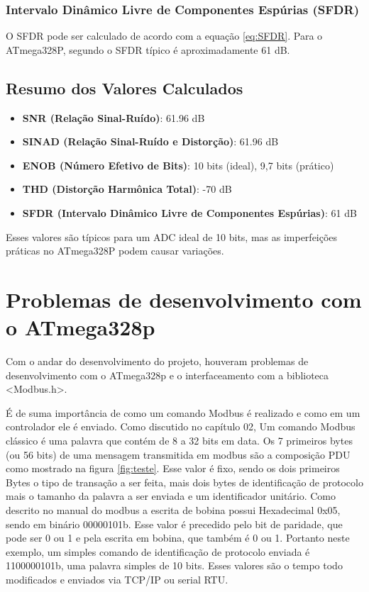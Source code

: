 \subsubsection{Intervalo Dinâmico Livre de Componentes Espúrias (SFDR)}

O SFDR pode ser calculado de acordo com a equação \ref{eq:SFDR}. Para o ATmega328P, segundo \cite{atmega328p_datasheet} o SFDR típico é aproximadamente 61 dB.

\subsection{Resumo dos Valores Calculados}

\begin{itemize}
    \item \textbf{SNR (Relação Sinal-Ruído)}: 61.96 dB
    \item \textbf{SINAD (Relação Sinal-Ruído e Distorção)}: 61.96 dB
    \item \textbf{ENOB (Número Efetivo de Bits)}: 10 bits (ideal), 9,7 bits (prático)
    \item \textbf{THD (Distorção Harmônica Total)}: -70 dB
    \item \textbf{SFDR (Intervalo Dinâmico Livre de Componentes Espúrias)}: 61 dB
\end{itemize}

Esses valores são típicos para um ADC ideal de 10 bits, mas as imperfeições práticas no ATmega328P podem causar variações.

\section{Problemas de desenvolvimento com o ATmega328p}

Com o andar do desenvolvimento do projeto, houveram problemas de desenvolvimento com o ATmega328p e o interfaceamento com a biblioteca <Modbus.h>.

É de suma importância de como um comando Modbus é realizado e como em um controlador ele é enviado. Como discutido no capítulo 02, Um comando Modbus clássico é uma palavra que contém de 8 a 32 bits em data. Os 7 primeiros bytes (ou 56 bits) de uma mensagem transmitida em modbus são a composição PDU como mostrado na figura \ref{fig:teste}. Esse valor é fixo, sendo os dois primeiros Bytes o tipo de transação a ser feita, mais dois bytes de identificação de protocolo mais o tamanho da palavra a ser enviada e um identificador unitário. Como descrito no manual do modbus \cite{modbus2006} a escrita de bobina possui Hexadecimal 0x05, sendo em binário 00000101b. Esse valor é precedido pelo bit de paridade, que pode ser 0 ou 1 e pela escrita em bobina, que também é 0 ou 1. Portanto neste exemplo, um simples comando de identificação de protocolo enviada é 1100000101b, uma palavra simples de 10 bits. Esses valores são o tempo todo modificados e enviados via TCP/IP ou serial RTU.


